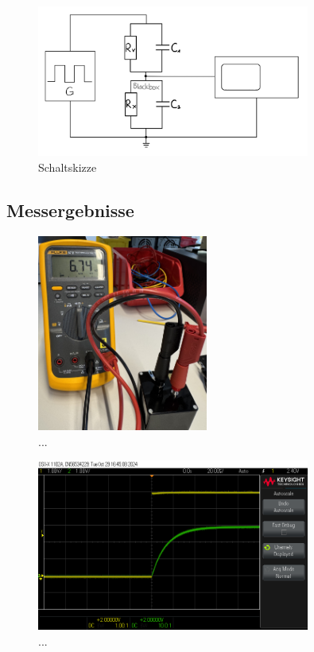 \documentclass[a4paper,12pt]{article}
\begin{document}
\begin{figure}[H]
    \centering
    \includegraphics[width=0.8\textwidth]{../Quellen/Labor2/SkizzeVerschaltungWiderstandKondensatorVersuch2.jpeg}
\caption{Schaltskizze}
\end{figure}


\subsection{Messergebnisse}
\begin{figure}[H]
    \centering
    \includegraphics[width=0.5\textwidth]{../Quellen/Labor2/Fotos/IMG_3973gezoomt.jpeg}
\caption{...}
\end{figure}



\begin{figure}[H]
    \centering
    \includegraphics[width=0.8\textwidth]{../Quellen/Labor2/scope_3.png}
\caption{...}
\end{figure}
\end{document}
